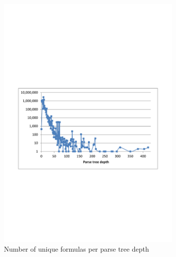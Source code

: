 \documentclass[times]{smrauth}
\begin{document}
\begin{figure}
	\centering
	\begin{subfigure}[b]{0.49\textwidth}
		\centering
		\includegraphics[width=1\textwidth]{img/depths1}
		\caption{Number of unique formulas per parse tree depth}
		\label{fig:depthTree}
	\end{subfigure}
	~
	\begin{subfigure}[b]{0.49\textwidth}
		\centering

\end{subfigure}
\end{figure}
\end{document}
